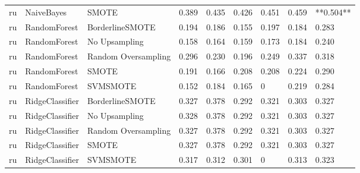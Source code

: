 \begin{tabular}{lllllllll}
      ru &                      NaiveBayes &                         SMOTE & 0.389 &                     0.435 &                 0.426 &                  0.451 &                                   0.459 & **0.504** \\
      ru &                    RandomForest &               BorderlineSMOTE & 0.194 &                     0.186 &                 0.155 &                  0.197 &                                   0.184 &     0.283 \\
      ru &                    RandomForest &                 No Upsampling & 0.158 &                     0.164 &                 0.159 &                  0.173 &                                   0.184 &     0.240 \\
      ru &                    RandomForest &           Random Oversampling & 0.296 &                     0.230 &                 0.196 &                  0.249 &                                   0.337 &     0.318 \\
      ru &                    RandomForest &                         SMOTE & 0.191 &                     0.166 &                 0.208 &                  0.208 &                                   0.224 &     0.290 \\
      ru &                    RandomForest &                      SVMSMOTE & 0.152 &                     0.184 &                 0.165 &                      0 &                                   0.219 &     0.284 \\
      ru &                 RidgeClassifier &               BorderlineSMOTE & 0.327 &                     0.378 &                 0.292 &                  0.321 &                                   0.303 &     0.327 \\
      ru &                 RidgeClassifier &                 No Upsampling & 0.328 &                     0.378 &                 0.292 &                  0.321 &                                   0.303 &     0.327 \\
      ru &                 RidgeClassifier &           Random Oversampling & 0.327 &                     0.378 &                 0.292 &                  0.321 &                                   0.303 &     0.327 \\
      ru &                 RidgeClassifier &                         SMOTE & 0.327 &                     0.378 &                 0.292 &                  0.321 &                                   0.303 &     0.327 \\
      ru &                 RidgeClassifier &                      SVMSMOTE & 0.317 &                     0.312 &                 0.301 &                      0 &                                   0.313 &     0.323 \\

\end{tabular}
